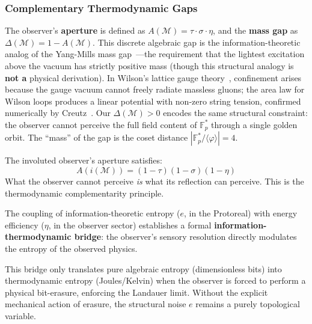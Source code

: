 \subsubsection{Complementary Thermodynamic Gaps}

The observer's \textbf{aperture} is defined as $A(\mathcal{M}) = \tau \cdot \sigma \cdot \eta$, and the \textbf{mass gap} as $\Delta(\mathcal{M}) = 1 - A(\mathcal{M})$. This discrete algebraic gap is the information-theoretic analog of the Yang-Mills mass gap~\cite{jaffe2000}---the requirement that the lightest excitation above the vacuum has strictly positive mass (though this structural analogy is \textbf{not a} physical derivation). In Wilson's lattice gauge theory~\cite{wilson1974}, confinement arises because the gauge vacuum cannot freely radiate massless gluons; the area law for Wilson loops produces a linear potential with non-zero string tension, confirmed numerically by Creutz~\cite{creutz1980}. Our $\Delta(\mathcal{M}) > 0$ encodes the same structural constraint: the observer cannot perceive the full field content of $\mathbb{F}_p^*$ through a single golden orbit. The ``mass'' of the gap is the coset distance $|\mathbb{F}_p^* / \langle\varphi\rangle| = 4$.

\begin{theorem}
The involuted observer's aperture satisfies:
\begin{equation}
    A(i(\mathcal{M})) = (1 - \tau)(1 - \sigma)(1 - \eta)
\end{equation}
What the observer cannot perceive \emph{is} what its reflection can perceive. This is the thermodynamic complementarity principle.
\end{theorem}

The coupling of information-theoretic entropy ($e$, in the Protoreal) with energy efficiency ($\eta$, in the observer sector) establishes a formal \textbf{information-thermodynamic bridge}: the observer's sensory resolution directly modulates the entropy of the observed physics. 

\begin{theorem}
This bridge only translates pure algebraic entropy (dimensionless bits) into thermodynamic entropy (Joules/Kelvin) when the observer is forced to perform a physical bit-erasure, enforcing the Landauer limit. Without the explicit mechanical action of erasure, the structural noise $e$ remains a purely topological variable.
\end{theorem}

